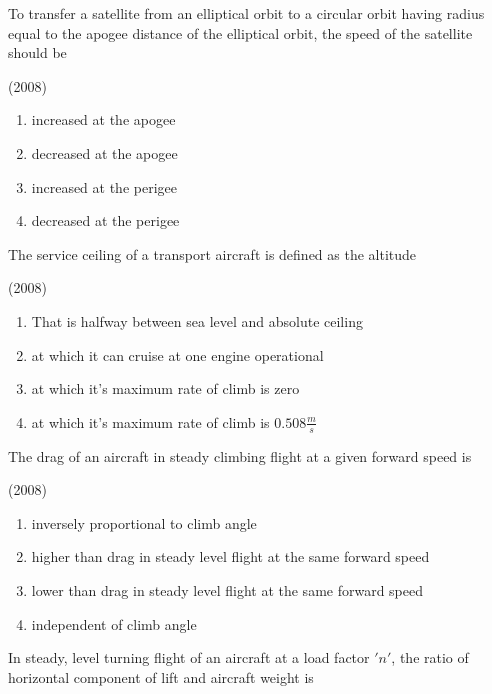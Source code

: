     \item To transfer a satellite from an elliptical orbit to a circular orbit having radius equal to the apogee distance of the elliptical orbit, the speed of the satellite should be
    
    \hfill{(2008)}

		\begin{multicols}{2}
			\begin{enumerate}
				\item increased at the apogee
				\item decreased at the apogee
				\item increased at the perigee
				\item decreased at the perigee
			\end{enumerate}
		\end{multicols}

    \item The service ceiling of a transport aircraft is defined as the altitude
    
    \hfill{(2008)}

       \begin{enumerate}
            \item That is halfway between sea level and absolute ceiling
            \item at which it can cruise at one engine operational
            \item at which it's maximum rate of climb is zero
            \item at which it's maximum rate of climb is $0.508\frac{m}{s}$
        \end{enumerate}
  
    \item The drag of an aircraft in steady climbing flight at a given forward speed is 
    
    \hfill{(2008)}

        \begin{enumerate}
            \item inversely proportional to climb angle
            \item higher than drag in steady level flight at the same forward speed
            \item lower than drag in steady level flight at the same forward speed
            \item independent of climb angle
        \end{enumerate}

    \item In steady, level turning flight of an aircraft at a load factor $'n'$, the ratio of horizontal component of lift and aircraft weight is
    
